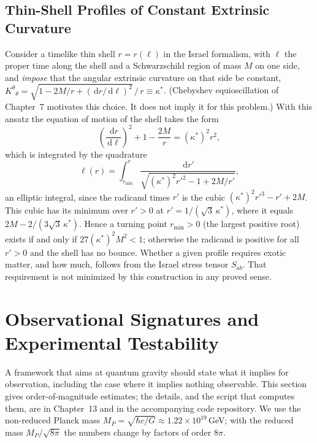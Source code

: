 \documentclass[11pt,a4paper,reqno]{amsart}
\theoremstyle{definition}
\numberwithin{equation}{section}
\newcommand{\dif}{\,\mathrm{d}}
\begin{document}
\subsection{Thin-Shell Profiles of Constant Extrinsic Curvature}
Consider a timelike thin shell $r = r(\ell)$ in the Israel formalism, with $\ell$ the proper time along the shell and a Schwarzschild region of mass $M$ on one side, and \emph{impose} that the angular extrinsic curvature on that side be constant, $K^\theta{}_\theta = \sqrt{1 - 2M/r + (\dif r/\dif\ell)^2}\,/\,r \equiv \kappa^*$. (Chebyshev equioscillation of Chapter~7 motivates this choice. It does not imply it for this problem.) With this ansatz the equation of motion of the shell takes the form
\begin{equation}
    \left( \frac{\dif r}{\dif \ell} \right)^2 + 1 - \frac{2 M}{r} = (\kappa^*)^2 r^2,
\end{equation}
which is integrated by the quadrature
\begin{equation}
    \label{eq:jacobi_throat_solution}
    \ell(r) = \int_{r_{\min}}^{r} \frac{\dif r'}{\sqrt{(\kappa^*)^2 r'^2 - 1 + 2M/r'}},
\end{equation}
an elliptic integral, since the radicand times $r'$ is the cubic $(\kappa^*)^2 r'^3 - r' + 2M$. This cubic has its minimum over $r' > 0$ at $r' = 1/(\sqrt3\,\kappa^*)$, where it equals $2M - 2/(3\sqrt3\,\kappa^*)$. Hence a turning point $r_{\min} > 0$ (the largest positive root) exists if and only if $27(\kappa^*)^2M^2 < 1$; otherwise the radicand is positive for all $r' > 0$ and the shell has no bounce. Whether a given profile requires exotic matter, and how much, follows from the Israel stress tensor $S_{ab}$. That requirement is not minimized by this construction in any proved sense.

\section{Observational Signatures and Experimental Testability}
\label{sec:experimental}

A framework that aims at quantum gravity should state what it implies for observation, including the case where it implies nothing observable. This section gives order-of-magnitude estimates; the details, and the script that computes them, are in Chapter~13 and in the accompanying code repository. We use the non-reduced Planck mass $M_P = \sqrt{\hbar c/G} \approx 1.22 \times 10^{19}$\,GeV; with the reduced mass $M_P/\sqrt{8\pi}$ the numbers change by factors of order $8\pi$.
\end{document}
